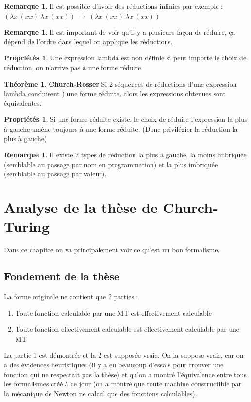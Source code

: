 \documentclass[11pt,a4paper]{article}
\theoremstyle{definition}
\newtheorem{myprop}[mydef]{Propriétés}
\newtheorem{myrem}[mydef]{Remarque}
\newtheorem{mytheo}[mydef]{Théorème}
\begin{document}
\begin{myrem}
	Il est possible d'avoir des réductions infinies par exemple : 
	$(\lambda x\ (xx)\ \lambda x \ (xx)) \ \rightarrow \ (\lambda x\ (xx) \  
\lambda x \ (xx))$
\end{myrem}

\begin{myrem}
	Il est important de voir qu'il y a plusieurs façon de réduire, ça 
	dépend de l'ordre dans lequel on applique les réductions.
\end{myrem}

\begin{myprop}
	Une expression lambda est non définie si peut importe le choix de 
	réduction, on n’arrive pas à une forme réduite.
\end{myprop}

\begin{mytheo}
	\textbf{Church-Rosser} Si 2 séquences de réductions d'une expression 
	lambda conduisent ) une forme réduite, alors les expressions obtenues 
	sont équivalentes.
\end{mytheo}

\begin{myprop}
	Si une forme réduite existe, le choix de réduire l'expression la plus à 
	gauche amène toujours à une forme réduite. (Donc privilégier la 
	réduction la plus à gauche)
\end{myprop}

\begin{myrem}
	Il existe 2 types de réduction la plus à gauche, la moins imbriquée 
	(semblable au passage par nom en programmation) et la plus imbriquée 
	(semblable au passage par valeur).
\end{myrem}

\section{Analyse de la thèse de Church-Turing}
\label{sec:analyse_de_la_th_se_de_church_turing}
Dans ce chapitre on va principalement voir ce qu'est un bon formalisme.

\subsection{Fondement de la thèse}
\label{sub:fondement_de_la_th_se}
La forme originale ne contient que 2 parties :
\begin{enumerate}
	\item Toute fonction calculable par une MT est effectivement calculable
	\item Toute fonction effectivement calculable est effectivement 
		calculable par une MT 
\end{enumerate}
La partie 1 est démontrée et la 2 est supposée vraie. 
On la suppose vraie, car on a des évidences heuristiques (il y a eu beaucoup 
d'essais pour trouver une fonction qui ne respectait pas la thèse) et qu'on a montré 
l'équivalence entre tous les formalismes créé à ce jour (on a montré que toute 
machine constructible par la mécanique de Newton ne calcul que des fonctions 
calculables). 
\end{document}
